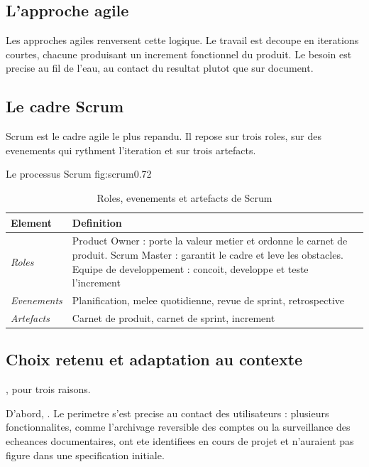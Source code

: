 \subsection{L'approche agile}

Les approches agiles renversent cette logique. Le travail est decoupe en
iterations courtes, chacune produisant un increment fonctionnel du
produit. Le besoin est precise au fil de l'eau, au contact du resultat
plutot que sur document.

\subsection{Le cadre Scrum}

Scrum est le cadre agile le plus repandu. Il repose sur trois roles, sur
des evenements qui rythment l'iteration et sur trois artefacts.

  {Le processus Scrum}
  {fig:scrum}{0.72}

\begin{table}[H]
\centering
\caption{Roles, evenements et artefacts de Scrum}
\label{tab:scrum}
\small
\begin{tabularx}{\textwidth}{@{}p{2.8cm}X@{}}
\toprule
\textbf{Element} & \textbf{Definition} \\ \midrule
\textit{Roles} & Product Owner : porte la valeur metier et ordonne le
  carnet de produit. Scrum Master : garantit le cadre et leve les
  obstacles. Equipe de developpement : concoit, developpe et teste
  l'increment \\
\textit{Evenements} & Planification, melee quotidienne, revue de sprint,
  retrospective \\
\textit{Artefacts} & Carnet de produit, carnet de sprint, increment \\
\bottomrule
\end{tabularx}
\end{table}

\subsection{Choix retenu et adaptation au contexte}

, pour trois raisons.

D'abord, .
Le perimetre s'est precise au contact des utilisateurs : plusieurs
fonctionnalites, comme l'archivage reversible des comptes ou la
surveillance des echeances documentaires, ont ete identifiees en cours de
projet et n'auraient pas figure dans une specification initiale.

